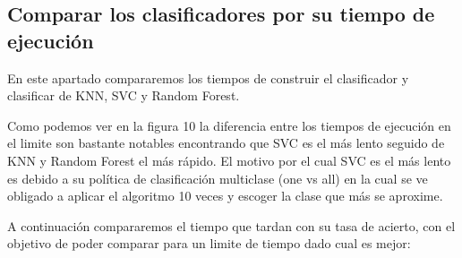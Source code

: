 \documentclass[8pt,a4paper]{{esannV2}}
\begin{document}
\subsection{Comparar los clasificadores por su tiempo de ejecución}

En este apartado compararemos los tiempos de construir el clasificador y clasificar de KNN, SVC y Random Forest.



Como podemos ver en la figura 10 la diferencia entre los tiempos de ejecución en el limite son bastante notables encontrando que SVC es el más lento seguido de KNN y Random Forest el más rápido. El motivo por el cual SVC es el más lento es debido a su política de clasificación multiclase (one vs all) en la cual se ve obligado a aplicar el algoritmo 10 veces y escoger la clase que más se aproxime.

A continuación compararemos el tiempo que tardan con su tasa de acierto, con el objetivo de poder comparar para un limite de tiempo dado cual es mejor:
\end{document}
